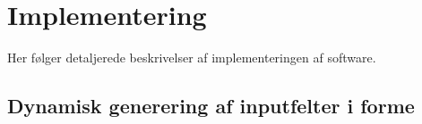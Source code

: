 \chapter{Implementering}

Her følger detaljerede beskrivelser af implementeringen af software.

\section{Dynamisk generering af inputfelter i forme}


